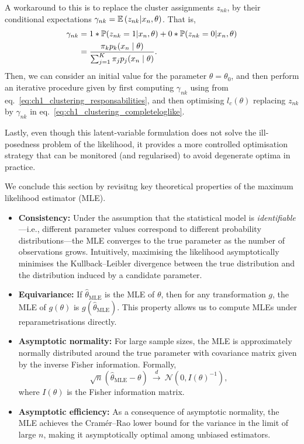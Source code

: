 \begin{example}[Clustering]
A workaround to this is to replace the cluster assignments $z_{nk}$, by their conditional expectations $\gamma_{nk} = \E{z_{nk}|x_{n}, \theta}$. That is, 
\begin{align}
	\label{eq:ch1_clustering_responsabilities}
	\gamma_{nk}
	&= 1*\P(z_{nk} = 1 |x_n, \theta) + 0*\P(z_{nk} = 0 |x_n, \theta)\nonumber \\ 
	&= \frac{\pi_k p_k(x_n \mid \theta)}{\sum_{j=1}^{K}\pi_j p_j(x_n \mid \theta)}.
\end{align}
Then, we can consider an initial value for the parameter $\theta=\theta_0$, and then perform an iterative procedure given by first computing $\gamma_{nk}$ using from eq.~\eqref{eq:ch1_clustering_responsabilities}, and then optimising $l_c(\theta)$  replacing $z_{nk}$ by $\gamma_{nk}$  in eq.~\eqref{eq:ch1_clustering_completeloglike}.


Lastly, even though this latent-variable formulation does not solve the ill-posedness problem of the likelihood, it provides a more controlled optimisation strategy that can be monitored (and regularised) to avoid degenerate optima in practice. 
\end{example}


We conclude this section by revisitng key theoretical properties of the maximum likelihood estimator (MLE).

\begin{itemize}
    \item \textbf{Consistency:} Under the assumption that the statistical model is \emph{identifiable}—i.e., different parameter values correspond to different probability distributions—the MLE converges to the true parameter as the number of observations grows. Intuitively, maximising the likelihood asymptotically minimises the Kullback--Leibler divergence between the true distribution and the distribution induced by a candidate parameter.
    
    \item \textbf{Equivariance:} If $\hat{\theta}_{\mathrm{MLE}}$ is the MLE of $\theta$, then for any transformation $g$, the MLE of $g(\theta)$ is $g(\hat{\theta}_{\mathrm{MLE}})$. This property allows us to compute MLEs under reparametrisations directly.
    
    \item \textbf{Asymptotic normality:} For large sample sizes, the MLE is approximately normally distributed around the true parameter with covariance matrix given by the inverse Fisher information. Formally, 
    \[
        \sqrt{n}(\hat{\theta}_{\mathrm{MLE}} - \theta) \ \xrightarrow{d} \ \mathcal{N}(0, I(\theta)^{-1}),
    \]
    where $I(\theta)$ is the Fisher information matrix.
    
    \item \textbf{Asymptotic efficiency:} As a consequence of asymptotic normality, the MLE achieves the Cramér--Rao lower bound for the variance in the limit of large $n$, making it asymptotically optimal among unbiased estimators.
\end{itemize}

